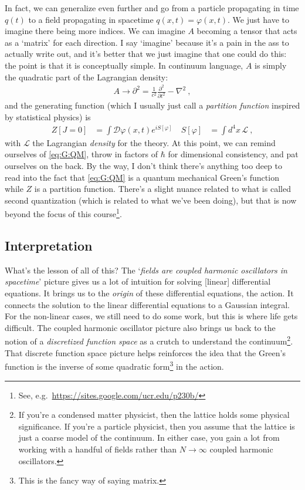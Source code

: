 In fact, we can generalize even further and go from a particle propagating in time $q(t)$ to a field propagating in spacetime $q(x,t) = \varphi(x,t)$. We just have to imagine there being more indices. We can imagine $A$ becoming a tensor that acts as a `matrix' for each direction. I say `imagine' because it's a pain in the ass to actually write out, and it's better that we just imagine that one could do this: the point is that it is conceptually simple. 
In continuum language, $A$ is simply the quadratic part of the Lagrangian density:
\begin{align}
	A\to \partial^2 = \frac{1}{c^2} \frac{\partial^2}{\partial t^2} - \nabla^2 \ ,
\end{align}
and the generating function (which I usually just call a \emph{partition function} inspired by statistical physics) is
\begin{align}
	Z[J=0] &= \int \mathcal D\varphi(x,t) e^{iS[\varphi]} \ 
	&
	S[\varphi] &= \int d^4x \, \mathcal L \ ,
\end{align}
with $\mathcal L$ the Lagrangian \emph{density} for the theory. At this point, we can remind ourselves of \eqref{eq:G:QM}, throw in factors of $\hbar$ for dimensional consistency, and pat ourselves on the back. By the way, I don't think there's anything too deep to read into the fact that \eqref{eq:G:QM} is a quantum mechanical Green's function while $Z$ is a partition function. There's a slight nuance related to what is called second quantization (which is related to what we've been doing), but that is now beyond the focus of this course\footnote{See, e.g.~\url{https://sites.google.com/ucr.edu/p230b/}}.

\subsection{Interpretation}

What's the lesson of all of this? The `\emph{fields are coupled harmonic oscillators in spacetime}' picture gives us a lot of intuition for solving [linear] differential equations. It brings us to the \emph{origin} of these differential equations, the action. It connects the solution to the linear differential equations to a Gaussian integral. For the non-linear cases, we still need to do some work, but this is where life gets difficult. The coupled harmonic oscillator picture also brings us back to the notion of a \emph{discretized function space} as a crutch to understand the continuum\footnote{If you're a condensed matter physicist, then the lattice holds some physical significance. If you're a particle physicist, then you assume that the lattice is just a coarse model of the continuum. In either case, you gain a lot from working with a handful of fields rather than $N\to \infty$ coupled harmonic oscillators.}. That discrete function space picture helps reinforces the idea that the Green's function is the inverse of some quadratic form\footnote{This is the fancy way of saying matrix.} in the action. 

